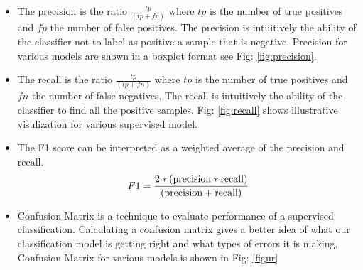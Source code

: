 \documentclass{article}
\begin{document}
\begin{itemize}
	\item The precision is the ratio $\frac{tp}{(tp + fp)}$ where $tp$ is the number of true positives and $fp$ the number of false positives. The precision is intuitively the ability of the classifier not to label as positive a sample that is negative. Precision for various models are shown in a boxplot format see Fig: \ref{fig:precision}. 
	
	\item The recall is the ratio  $\frac{tp}{(tp + fn)}$ where $tp$ is the number of true positives and $fn$ the number of false negatives. The recall is intuitively the ability of the classifier to find all the positive samples. Fig: \ref{fig:recall} shows illustrative visulization for various supervised model. 
	
	\item The F1 score can be interpreted as a weighted average of the precision and recall. $$F1 = \frac{2 * (\rm{precision} * \rm{recall})}{ (\rm{precision} + \rm{recall})}$$
	
	\item Confusion Matrix is a technique to evaluate performance of a supervised classification. Calculating a confusion matrix gives a better idea of what our classification model is getting right and what types of errors it is making. Confusion Matrix for various models is shown in Fig: \ref{figur}
	

\end{itemize}
\end{document}
